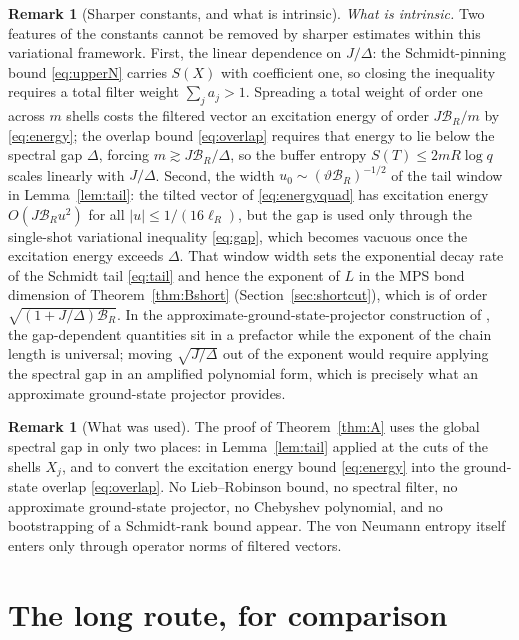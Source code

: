 \documentclass[aps,prx,reprint,superscriptaddress,floatfix,nofootinbib,longbibliography,amsmath,amssymb]{revtex4-2}
\newcommand{\abs}[1]{\lvert #1\rvert}
\newcommand{\cB}{\mathcal B}
\theoremstyle{plain}
\theoremstyle{definition}
\newtheorem{remark}[theorem]{Remark}
\begin{document}
\begin{remark}[Sharper constants, and what is intrinsic]
\emph{What is intrinsic.} Two features of the constants cannot be removed
by sharper estimates within this variational framework. First, the linear
dependence on $J/\Delta$: the Schmidt-pinning bound \eqref{eq:upperN}
carries $S(X)$ with coefficient one, so closing the inequality requires a
total filter weight $\sum_ja_j>1$. Spreading a total weight of order one
across $m$ shells costs the filtered vector an excitation energy of order
$J\cB_R/m$ by \eqref{eq:energy}; the overlap bound \eqref{eq:overlap}
requires that energy to lie below the spectral gap $\Delta$, forcing
$m\gtrsim J\cB_R/\Delta$, so the buffer entropy $S(T)\le2mR\log q$ scales
linearly with $J/\Delta$. Second, the width
$u_0\sim(\vartheta\cB_R)^{-1/2}$ of the tail window in
Lemma~\ref{lem:tail}: the tilted vector of \eqref{eq:energyquad} has
excitation energy $O(J\cB_Ru^2)$ for all $\abs u\le1/(16\ell_R)$, but the
gap is used only through the single-shot variational inequality
\eqref{eq:gap}, which becomes vacuous once the excitation energy exceeds
$\Delta$. That window width sets the exponential decay rate of the Schmidt
tail \eqref{eq:tail} and hence the exponent of $L$ in the MPS bond
dimension of Theorem~\ref{thm:Bshort} (Section~\ref{sec:shortcut}), which
is of order $\sqrt{(1+J/\Delta)\cB_R}$. In the
approximate-ground-state-projector construction of \cite{AKLV}, the
gap-dependent quantities sit in a prefactor while the exponent of the
chain length is universal; moving $\sqrt{J/\Delta}$ out of the exponent
would require applying the spectral gap in an amplified polynomial form,
which is precisely what an approximate ground-state projector provides.
\end{remark}

\begin{remark}[What was used]
The proof of Theorem~\ref{thm:A} uses the global spectral gap in only two
places: in Lemma~\ref{lem:tail} applied at the cuts of the shells $X_j$,
and to convert the excitation energy bound \eqref{eq:energy} into the
ground-state overlap \eqref{eq:overlap}. No Lieb--Robinson bound, no
spectral filter, no approximate ground-state projector, no Chebyshev
polynomial, and no bootstrapping of a Schmidt-rank bound appear. The von
Neumann entropy itself enters only through operator norms of filtered
vectors.
\end{remark}

\section{The long route, for comparison}\label{sec:longroute}
\end{document}
